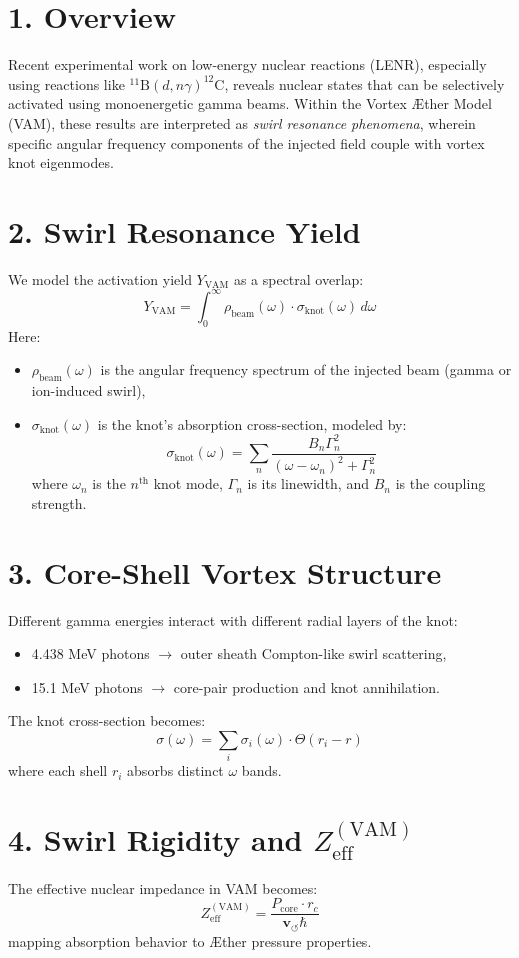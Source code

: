 \documentclass[a4paper, aps,preprint,superscriptaddress, 12pt]{revtex4}
\begin{document}
\section*{1. Overview}
Recent experimental work on low-energy nuclear reactions (LENR), especially using reactions like $^{11}\mathrm{B}(d,n\gamma)^{12}\mathrm{C}$, reveals nuclear states that can be selectively activated using monoenergetic gamma beams. Within the Vortex Æther Model (VAM), these results are interpreted as \textit{swirl resonance phenomena}, wherein specific angular frequency components of the injected field couple with vortex knot eigenmodes.
\section*{2. Swirl Resonance Yield}
We model the activation yield $Y_{\mathrm{VAM}}$ as a spectral overlap:
\[
Y_{\mathrm{VAM}} = \int_0^\infty \rho_{\mathrm{beam}}(\omega) \cdot \sigma_{\mathrm{knot}}(\omega) \, d\omega
\]
Here:
\begin{itemize}
  \item $\rho_{\mathrm{beam}}(\omega)$ is the angular frequency spectrum of the injected beam (gamma or ion-induced swirl),
  \item $\sigma_{\mathrm{knot}}(\omega)$ is the knot's absorption cross-section, modeled by:
  \[
  \sigma_{\mathrm{knot}}(\omega) = \sum_n \frac{B_n \Gamma_n^2}{(\omega - \omega_n)^2 + \Gamma_n^2}
  \]
  where $\omega_n$ is the $n^\text{th}$ knot mode, $\Gamma_n$ is its linewidth, and $B_n$ is the coupling strength.
\end{itemize}
\section*{3. Core-Shell Vortex Structure}
Different gamma energies interact with different radial layers of the knot:
\begin{itemize}
  \item 4.438 MeV photons $\rightarrow$ outer sheath Compton-like swirl scattering,
  \item 15.1 MeV photons $\rightarrow$ core-pair production and knot annihilation.
\end{itemize}
The knot cross-section becomes:
\[
\sigma(\omega) = \sum_i \sigma_i(\omega) \cdot \Theta(r_i - r)
\]
where each shell $r_i$ absorbs distinct $\omega$ bands.
\section*{4. Swirl Rigidity and $Z_{\mathrm{eff}}^{(\mathrm{VAM})}$}
The effective nuclear impedance in VAM becomes:
\[
Z_{\mathrm{eff}}^{(\mathrm{VAM})} = \frac{P_{\mathrm{core}} \cdot r_c}{\mathbf{v}_{\scriptscriptstyle\boldsymbol{\circlearrowleft}} \hbar}
\]
mapping absorption behavior to Æther pressure properties.
\end{document}
